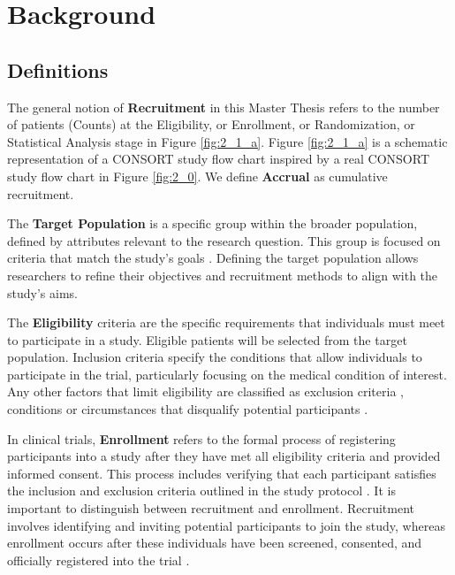 








\chapter{Background} 

\section{Definitions}

The general notion of \textbf{Recruitment} in this Master Thesis refers to the number of patients (Counts) at the Eligibility, or Enrollment, or Randomization, or Statistical Analysis stage in Figure \ref{fig:2_1_a}. Figure \ref{fig:2_1_a} is a schematic representation of a CONSORT study flow chart \citep{schulz2010consort} inspired by a real CONSORT study flow chart in Figure \ref{fig:2_0}. We define \textbf{Accrual} as cumulative recruitment.

The \textbf{Target Population} is a specific group within the broader population, defined by attributes relevant to the research question. This group is focused on criteria that match the study's goals \citep{willie2024population}. Defining the target population allows researchers to refine their objectives and recruitment methods to align with the study's aims.


The \textbf{Eligibility} criteria are the specific requirements that individuals must meet to participate in a study. Eligible patients will be selected from the target population. Inclusion criteria specify the conditions that allow individuals to participate in the trial, particularly focusing on the medical condition of interest. Any other factors that limit eligibility are classified as exclusion criteria \citep{van2007eligibility}, conditions or circumstances that disqualify potential participants \citep{food2018evaluating}.


In clinical trials, \textbf{Enrollment} refers to the formal process of registering participants into a study after they have met all eligibility criteria and provided informed consent. This process includes verifying that each participant satisfies the inclusion and exclusion criteria outlined in the study protocol \citep{NIH2021}. It is important to distinguish between recruitment and enrollment. Recruitment involves identifying and inviting potential participants to join the study, whereas enrollment occurs after these individuals have been screened, consented, and officially registered into the trial \citep{frank2004current}. 

